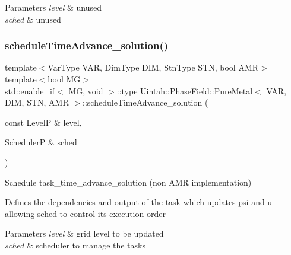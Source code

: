 \begin{DoxyParams}{Parameters}
{\em level} & unused \\
\hline
{\em sched} & unused \\
\hline
\end{DoxyParams}
\mbox{\label{classUintah_1_1PhaseField_1_1PureMetal_ab026cd5b66042139121875ff1a7d1137}} 
\subsubsection{\texorpdfstring{schedule\+Time\+Advance\+\_\+solution()}{scheduleTimeAdvance\_solution()}\hspace{0.1cm}{\footnotesize\ttfamily [1/2]}}
{\footnotesize\ttfamily template$<$Var\+Type V\+AR, Dim\+Type D\+IM, Stn\+Type S\+TN, bool A\+MR$>$ \\
template$<$bool MG$>$ \\
std\+::enable\+\_\+if$<$ MG, void $>$\+::type \hyperlink{classUintah_1_1PhaseField_1_1PureMetal}{Uintah\+::\+Phase\+Field\+::\+Pure\+Metal}$<$ V\+AR, D\+IM, S\+TN, A\+MR $>$\+::schedule\+Time\+Advance\+\_\+solution (\begin{DoxyParamCaption}\item[{const LevelP \&}]{level,  }\item[{SchedulerP \&}]{sched }\end{DoxyParamCaption})\hspace{0.3cm}{\ttfamily [protected]}}



Schedule task\+\_\+time\+\_\+advance\+\_\+solution (non A\+MR implementation) 

Defines the dependencies and output of the task which updates psi and u allowing sched to control its execution order


\begin{DoxyParams}{Parameters}
{\em level} & grid level to be updated \\
\hline
{\em sched} & scheduler to manage the tasks \\
\hline
\end{DoxyParams}
\mbox{\label{classUintah_1_1PhaseField_1_1PureMetal_ab026cd5b66042139121875ff1a7d1137}} 
